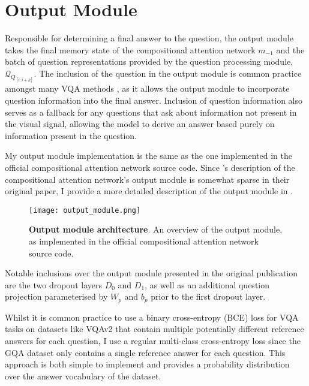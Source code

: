 \section{Output Module}
\label{section:output_module}

Responsible for determining a final answer to the question, the output module takes the final memory state of the compositional attention network \(m_{-1}\) and the batch of question representations provided by the question processing module, \(\mathcal{Q}_{Q_{[i:i+k]}}\). The inclusion of the question in the output module is common practice amongst many VQA methods \cite{hudson2018compositional, li2019relation, huang2020aligned}, as it allows the output module to incorporate question information into the final answer. Inclusion of question information also serves as a fallback for any questions that ask about information not present in the visual signal, allowing the model to derive an answer based purely on information present in the question.

My output module implementation is the same as the one implemented in the official compositional attention network source code. Since \citeauthor{hudson2018compositional}'s description of the compositional attention network's output module is somewhat sparse in their original paper, I provide a more detailed description of the output module in \figureautorefname{ \ref{fig:output_module}}.

\begin{figure}[htbp]
    \centering
    \texttt{[image: output\_module.png]}
    \caption[Output module architecture]{\textbf{Output module architecture}. An overview of the output module, as implemented in the official compositional attention network source code.}
    \label{fig:output_module}
\end{figure}

Notable inclusions over the output module presented in the original publication are the two dropout layers \(D_0\) and \(D_1\), as well as an additional question projection parameterised by \(W_p\) and \(b_p\) prior to the first dropout layer. 

Whilst it is common practice to use a binary cross-entropy (BCE) loss for VQA tasks \cite{teney2018tips} on datasets like VQAv2 \cite{goyal2017making} that contain multiple potentially different reference answers for each question, I use a regular multi-class cross-entropy loss since the GQA dataset only contains a single reference answer for each question. This approach is both simple to implement and provides a probability distribution over the answer vocabulary of the dataset.